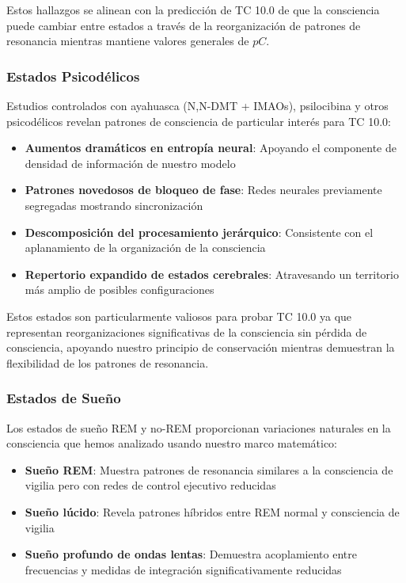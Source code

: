 \documentclass[12pt]{article}
\begin{document}
Estos hallazgos se alinean con la predicción de TC 10.0 de que la consciencia puede cambiar entre estados a través de la reorganización de patrones de resonancia mientras mantiene valores generales de $pC$.

\subsubsection{Estados Psicodélicos}

Estudios controlados con ayahuasca (N,N-DMT + IMAOs), psilocibina y otros psicodélicos revelan patrones de consciencia de particular interés para TC 10.0:

\begin{itemize}
    \item \textbf{Aumentos dramáticos en entropía neural}: Apoyando el componente de densidad de información de nuestro modelo
    \item \textbf{Patrones novedosos de bloqueo de fase}: Redes neurales previamente segregadas mostrando sincronización
    \item \textbf{Descomposición del procesamiento jerárquico}: Consistente con el aplanamiento de la organización de la consciencia
    \item \textbf{Repertorio expandido de estados cerebrales}: Atravesando un territorio más amplio de posibles configuraciones
\end{itemize}

Estos estados son particularmente valiosos para probar TC 10.0 ya que representan reorganizaciones significativas de la consciencia sin pérdida de consciencia, apoyando nuestro principio de conservación mientras demuestran la flexibilidad de los patrones de resonancia.

\subsubsection{Estados de Sueño}

Los estados de sueño REM y no-REM proporcionan variaciones naturales en la consciencia que hemos analizado usando nuestro marco matemático:

\begin{itemize}
    \item \textbf{Sueño REM}: Muestra patrones de resonancia similares a la consciencia de vigilia pero con redes de control ejecutivo reducidas
    \item \textbf{Sueño lúcido}: Revela patrones híbridos entre REM normal y consciencia de vigilia
    \item \textbf{Sueño profundo de ondas lentas}: Demuestra acoplamiento entre frecuencias y medidas de integración significativamente reducidas
\end{itemize}
\end{document}
